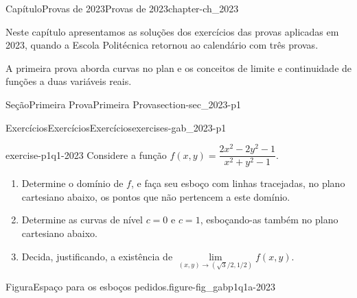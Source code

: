 \documentclass[oneside,10pt,]{book}
\numberwithin{equation}{section}
\begin{document}
%
%
\typeout{************************************************}
\typeout{************************************************}
%
\begin{chapterptx}{Capítulo}{Provas de 2023}{}{Provas de 2023}{}{}{chapter-ch_2023}
\renewcommand*{\chaptername}{Capítulo}
\begin{introduction}{}%
Neste capítulo apresentamos as soluções dos exercícios das provas aplicadas em 2023, quando a Escola Politécnica retornou ao calendário com três provas.%
\par
A primeira prova aborda curvas no plan e os conceitos de limite e continuidade de funções a duas variáveis reais.%
\end{introduction}%
%
%
\typeout{************************************************}
\typeout{************************************************}
%
\begin{sectionptx}{Seção}{Primeira Prova}{}{Primeira Prova}{}{}{section-sec_2023-p1}
%
%
\typeout{************************************************}
\typeout{************************************************}
%
\begin{exercises-subsection-numberless}{Exercícios}{Exercícios}{}{Exercícios}{}{}{exercises-gab_2023-p1}
\begin{divisionexercise}{1}{}{}{exercise-p1q1-2023}%
Considere a função \(f(x,y)=\dfrac{2x^2-2y^2-1}{x^2+y^2-1}\).%
\begin{enumerate}[label=\alph*]
\item{}Determine o domínio de \(f\), e faça seu esboço com linhas tracejadas, no plano cartesiano abaixo, os pontos que não pertencem a este domínio.%
\item{}Determine as curvas de nível \(c=0\) e \(c=1\), esboçando-as também no plano cartesiano abaixo.%
\item{}Decida, justificando, a existência de \(\lim\limits_{(x,y)\to (\sqrt{3}/2,1/2)}
f(x,y)\).%
\end{enumerate}
\begin{figureptx}{Figura}{Espaço para os esboços pedidos.}{figure-fig_gabp1q1a-2023}{}%
\begin{image}{0.25}{0.5}{0.25}{}%
\end{image}
\end{figureptx}
\end{divisionexercise}
\end{exercises-subsection-numberless}
\end{sectionptx}
\end{chapterptx}
\end{document}

